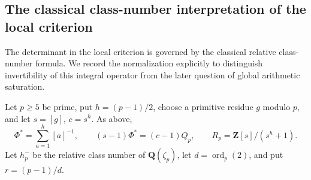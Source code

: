 \subsection{The classical class-number interpretation of the local criterion}
\label{subsec:cm-class-number}
The determinant in the local criterion is governed by the classical
relative class-number formula.  We record the normalization explicitly
to distinguish invertibility of this integral operator from the later
question of global arithmetic saturation.

Let \(p\geq5\) be prime, put \(h=(p-1)/2\), choose a primitive residue
\(g\) modulo \(p\), and let \(s=[g]\), \(c=s^h\).  As above,
\[
 \Phi^\ast=\sum_{a=1}^{h}[a]^{-1},\qquad
 (s-1)\Phi^\ast=(c-1)Q_p,\qquad
 R_p=\mathbf Z[s]/(s^h+1).
\]
Let \(h_p^-\) be the relative class number of
\(\mathbf Q(\zeta_p)\), let \(d=\operatorname{ord}_p(2)\), and put
\(r=(p-1)/d\).

